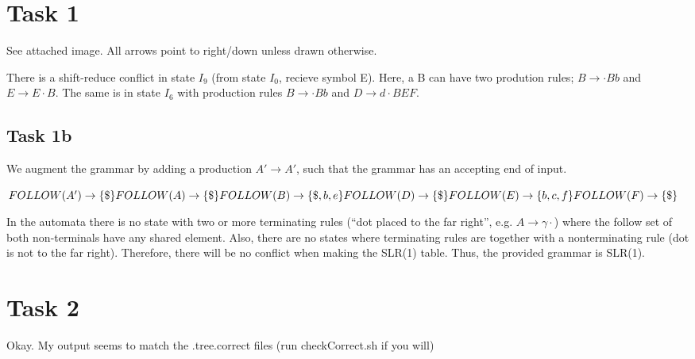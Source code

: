 \section*{Task 1}
See attached image. All arrows point to right/down unless drawn otherwise.

There is a shift-reduce conflict in state $I_{9}$ (from state $I_{0}$, recieve symbol E).
Here, a B can have two prodution rules; $B \rightarrow \cdot{}Bb$ and $E \rightarrow E\cdot{B}$.
The same is in state $I_{6}$ with production rules $B \rightarrow \cdot{Bb}$ and $D \rightarrow d\cdot{BEF}$.

\subsection*{Task 1b}
We augment the grammar by adding a production $A' \rightarrow A'$, such that the grammar has an accepting
end of input.

$
FOLLOW(A') \rightarrow \{\$\} \\                              
FOLLOW(A) \rightarrow \{\$\} \\                              
FOLLOW(B) \rightarrow \{\$, b, e\} \\                       
FOLLOW(D) \rightarrow \{\$\} \\                              
FOLLOW(E) \rightarrow \{b, c, f\} \\
FOLLOW(F) \rightarrow \{\$\} \\                     
$                                                              

In the automata there is no state with two or more terminating rules
(``dot placed to the far right'', e.g. $A \rightarrow \gamma{}\cdot$) where 
the follow set of both non-terminals have any shared element. Also, there are
no states where terminating rules are together with a nonterminating rule 
(dot is not to the far right). Therefore, there will be no conflict when 
making the SLR(1) table. Thus, the provided grammar is SLR(1).



\section*{Task 2}
Okay. My output seems to match the .tree.correct files (run checkCorrect.sh if you will)
